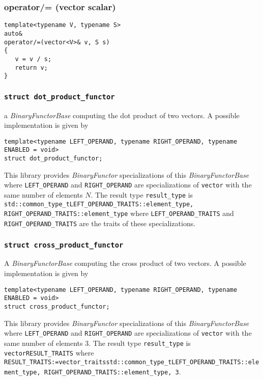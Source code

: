 \documentclass[oneside]{book}
\begin{document}
\subsubsection{operator/= (vector scalar)}
\begin{verbatim}
template<typename V, typename S>
auto&
operator/=(vector<V>& v, S s)
{
   v = v / s;
   return v;
}
\end{verbatim}

\subsubsection{\texttt{struct dot\_product\_functor}}
a \textit{BinaryFunctorBase} computing the dot product of two vectors.
A possible implementation is given by
\begin{verbatim}
template<typename LEFT_OPERAND, typename RIGHT_OPERAND, typename ENABLED = void>
struct dot_product_functor;
\end{verbatim}

This library provides \textit{BinaryFunctor} specializations of this \textit{BinaryFunctorBase}
where \texttt{LEFT\_OPERAND} and \texttt{RIGHT\_OPERAND} are specializations   of \texttt{vector} with   the
same number of elements $N$. The result type \texttt{result\_type} is\newline
\texttt{std::common\_type\_t\textlangle LEFT\_OPERAND\_TRAITS::element\_type, RIGHT\_OPERAND\_TRAITS::element\_type\textrangle}\newline
 where \texttt{LEFT\_OPERAND\_TRAITS} and \texttt{RIGHT\_OPERAND\_TRAITS} are the traits of these specializations.

\subsubsection{\texttt{struct cross\_product\_functor}}
A \textit{BinaryFunctorBase} computing the cross product of two vectors.
A possible implementation is given by
\begin{verbatim}
template<typename LEFT_OPERAND, typename RIGHT_OPERAND, typename ENABLED = void>
struct cross_product_functor;
\end{verbatim}

This library provides \textit{BinaryFunctor} specializations of this \textit{BinaryFunctorBase}
where \texttt{LEFT\_OPERAND} and \texttt{RIGHT\_OPERAND} are specializations of \texttt{vector} with   the
same number of elements $3$. The result type \texttt{result\_type} is  \texttt{vector\textlangle RESULT\_TRAITS\textrangle}
where\newline
\texttt{
RESULT\_TRAITS:=vector\_traits\textlangle std::common\_type\_t\textlangle{}LEFT\_OPERAND\_TRAITS::element\_type,\newline%
\hphantom{RESULT\_TRAITS:=vector\_traits\textlangle std::common\_type\_t\textlangle}RIGHT\_OPERAND\_TRAITS::element\_type\textrangle,\newline%
\hphantom{RESULT\_TRAITS:=vector\_traits\textlangle}3\textrangle}.
\end{document}
